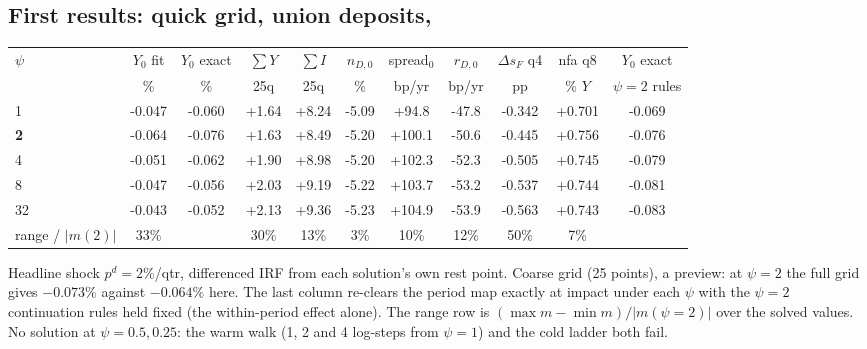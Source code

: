 \subsection*{First results: quick grid, union deposits, }

\begin{center}
\scriptsize
\setlength{\tabcolsep}{3.5pt}
\begin{tabular}{lcccccccccc}
\toprule
$\psi$ & $Y_0$ fit & $Y_0$ exact & $\sum Y$ & $\sum I$ & $n_{D,0}$ & spread$_0$ & $r_{D,0}$ & $\Delta s_F$ q4 & nfa q8 & $Y_0$ exact\\
 & \% & \% & 25q & 25q & \% & bp/yr & bp/yr & pp & \% $Y$ & $\psi{=}2$ rules\\
\midrule
1 & -0.047 & -0.060 & +1.64 & +8.24 & -5.09 & +94.8 & -47.8 & -0.342 & +0.701 & -0.069 \\
\textbf{2} & -0.064 & -0.076 & +1.63 & +8.49 & -5.20 & +100.1 & -50.6 & -0.445 & +0.756 & -0.076 \\
4 & -0.051 & -0.062 & +1.90 & +8.98 & -5.20 & +102.3 & -52.3 & -0.505 & +0.745 & -0.079 \\
8 & -0.047 & -0.056 & +2.03 & +9.19 & -5.22 & +103.7 & -53.2 & -0.537 & +0.744 & -0.081 \\
32 & -0.043 & -0.052 & +2.13 & +9.36 & -5.23 & +104.9 & -53.9 & -0.563 & +0.743 & -0.083 \\
\midrule
range / $|m(2)|$ & 33\% &  & 30\% & 13\% & 3\% & 10\% & 12\% & 50\% & 7\% &  \\
\bottomrule
\end{tabular}
\end{center}
{\footnotesize Headline shock $p^d=2\%$/qtr, differenced IRF from each solution's own rest point.
Coarse grid (25 points), a preview: at $\psi=2$ the full grid gives $-0.073\%$ against
$-0.064\%$ here. The last column re-clears the period map exactly at impact under each $\psi$ with the
$\psi=2$ continuation rules held fixed (the within-period effect alone). The range row is
$(\max m-\min m)/|m(\psi{=}2)|$ over the solved values. No solution at $\psi=0.5, 0.25$: the warm walk (1, 2 and 4 log-steps from $\psi=1$) and the cold ladder both fail.}


